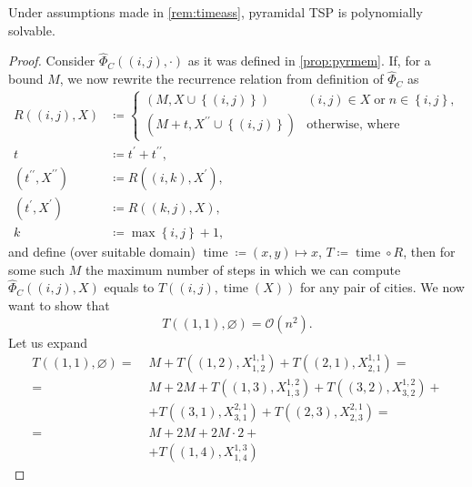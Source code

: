 \documentclass[index=totoc,bibliography=totoc]{scrartcl}
\numberwithin{equation}{section}
\numberwithin{figure}{section}
\numberwithin{table}{section}
\begin{document}
\begin{corollary}
\label{cor:pyrtime}
  Under assumptions made in \cref{rem:timeass},
  pyramidal TSP is polynomially solvable.
\end{corollary}
\begin{proof}
  Consider $\widehat{\Phi}_C\left((i,j),\cdot\right)$ as it was defined in \cref{prop:pyrmem}.
  If, for a bound $M$,
  we now rewrite the recurrence relation from definition of $\widehat{\Phi}_C$ as
  \begin{align}
    \label{eq:pyrtime}
    R\left((i,j),X\right) & \coloneqq
    \begin{cases}
      \left(M,X \cup \left\{(i,j)\right\}\right) & (i,j) \in X \;\text{or}\; n \in \left\{i,j\right\},
      \\
      \left(M+t,X^{\prime\prime} \cup \left\{(i,j)\right\}\right) & \text{otherwise, where}
    \end{cases}
    \\
    t & \coloneqq t^{\prime} + t^{\prime\prime},
    \nonumber
    \\
    \left(t^{\prime\prime},X^{\prime\prime}\right) & \coloneqq R\left((i,k),X^\prime\right),
    \nonumber
    \\
    \left(t^{\prime},X^{\prime}\right) & \coloneqq R\left((k,j),X\right),
    \nonumber
    \\
    k & \coloneqq \max \left\{i,j\right\} + 1,
    \nonumber
  \end{align}
  and define (over suitable domain)
  $\operatorname{time} \coloneqq (x,y) \mapsto x$,
  $T \coloneqq \operatorname{time} \circ R$,
  then for some such $M$
  the maximum number of steps in which we can compute
  $\widehat{\Phi}_C\left((i,j),X\right)$
  equals to
  $T\left((i,j),\operatorname{time}\left(X\right)\right)$
  for any pair of cities.
  We now want to show that
  \[
    T\left((1,1),\varnothing\right) = \mathcal{O}\left(n^2\right).
  \]
  Let us expand
  \begin{align*}
    T\left((1,1),\varnothing\right) =\; &
    M + T\left((1,2),X_{1,2}^{1,1}\right)
      + T\left((2,1),X_{2,1}^{1,1}\right) =
    \\ =\; & M + 2M + T\left((1,3),X_{1,3}^{1,2}\right)
                  + T\left((3,2),X_{3,2}^{1,2}\right) +
             \\ & + T\left((3,1),X_{3,1}^{2,1}\right)
                  + T\left((2,3),X_{2,3}^{2,1}\right) =
    \\ =\; & M + 2M + 2M\cdot 2 +
    \\ & + T\left((1,4),X_{1,4}^{1,3}\right)

\end{align*}
\end{proof}
\end{document}
